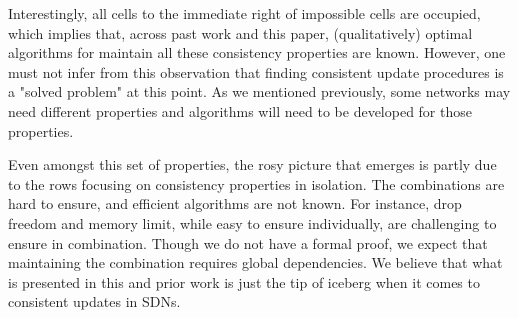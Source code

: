 Interestingly, all cells to the immediate right of impossible cells are occupied, which implies that, across past work and this paper,  (qualitatively) optimal algorithms for maintain all these consistency properties are known. However, one must not infer from this observation that finding consistent update procedures is a "solved problem" at this point.  As we mentioned previously, some networks may need different properties and algorithms will need to be developed for those properties. 

Even amongst this set of properties, the rosy picture that emerges is partly due to the rows focusing on consistency properties in isolation. The combinations are hard to  ensure, and efficient algorithms are not known. For instance, drop freedom and memory limit, while easy to ensure individually, are challenging to ensure in combination. Though we do not have a formal proof, we expect that maintaining the combination requires global dependencies. We believe that what is presented in this and prior work is just the tip of iceberg when it comes to consistent updates in SDNs. 
